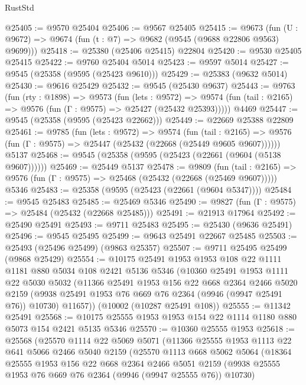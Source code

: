 \begin{lexlean}{RustStd}
\begin{coremodule}
@25405 := @9570 @25404
@25406 := @9567 @25405
@25415 := @9673
    (fun (U : @9672) => @9674 (fun (t : @7) => @9682 (@9545 (@9688 @22806 @9563) @9699)))
@25418 := @25380 (@25406 @25415) @22804
@25420 := @9530 @25405 @25415
@25422 := @9760 @25404 @5014
@25423 := @9597 @5014
@25427 := @9545 (@25358 (@9595 (@25423 @9610)))
@25429 := @25383 (@9632 @5014)
@25430 := @9616 @25429
@25432 := @9545 (@25430 @9637)
@25443 := @9763
    (fun (rty : @1898) =>
    @9573
      (fun (lets : @9572) =>
      @9574 (fun (tail : @2165) => @9576 (fun (Γ : @9575) => @25427 (@25432 @25393)))))
    @4469
@25447 := @9545 (@25358 (@9595 (@25423 @22662)))
@25449 := @22669 @25388 @22809
@25461 := @9785
    (fun (lets : @9572) =>
    @9574
      (fun (tail : @2165) =>
      @9576 (fun (Γ : @9575) => @25447 (@25432 (@22668 (@25449 @9605 @9607))))))
    @5137
@25468 := @9545 (@25358 (@9595 (@25423 (@22661 (@9604 (@5138 @9607))))))
@25469 := @25449 @5137
@25478 := @9809
    (fun (tail : @2165) => @9576 (fun (Γ : @9575) => @25468 (@25432 (@22668 (@25469 @9607)))))
    @5346
@25483 := @25358 (@9595 (@25423 (@22661 (@9604 @5347))))
@25484 := @9545 @25483
@25485 := @25469 @5346
@25490 := @9827 (fun (Γ : @9575) => @25484 (@25432 (@22668 @25485)))
@25491 := @21913 @17964
@25492 := @25490 @25491
@25493 := @9711 @25483
@25495 := @25430 (@9636 @25491)
@25496 := @9545 @25495
@25499 := @9643 @25491 @22667 @25485
@25503 := @25493 (@25496 @25499) (@9863 @25357)
@25507 := @9711 @25495 @25499 (@9868 @25429)
@25554 := @10175
    @25491
    @1953
    @1953
    @108
    @22
    @1111
    @1181
    @880
    @5034
    @108
    @2421
    @5136
    @5346
    (@10360
      @25491
      @1953
      @1111
      @22
      @5030
      @5032
      (@11366
        @25491
        @1953
        @156
        @22
        @668
        @2364
        @2466
        @5020
        @2159
        (@9938 @25491 @1953 @76 @669 @76 @2364 (@9946 (@9947 @25491 @76)) @10730)
        @11657))
    (@10002 (@10287 @25491 @108))
@25555 := @11342 @25491
@25568 := @10175 @25555 @1953 @1953 @154 @22 @1114 @1180 @880 @5073 @154 @2421 @5135 @5346
@25570 := @10360 @25555 @1953
@25618 := @25568
    (@25570
      @1114
      @22
      @5069
      @5071
      (@11366
        @25555
        @1953
        @1113
        @22
        @641
        @5066
        @2466
        @5040
        @2159
        (@25570
          @1113
          @668
          @5062
          @5064
          (@18364
            @25555
            @1953
            @156
            @22
            @668
            @2364
            @2466
            @5051
            @2159
            (@9938 @25555 @1953 @76 @669 @76 @2364 (@9946 (@9947 @25555 @76)) @10730)

\end{coremodule}
\end{lexlean}
